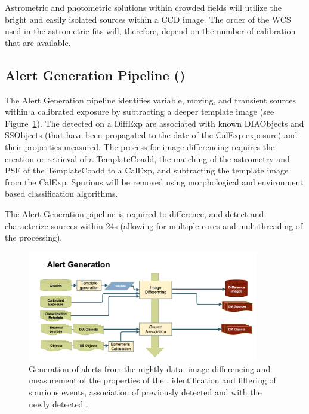 Astrometric and photometric solutions  within crowded fields will utilize the bright and easily isolated sources within a CCD image. The order of the WCS used in the astrometric fits will, therefore, depend on the number of calibration \Sources that are available.

\subsection{Alert Generation Pipeline (\wbsDiffim)}
\label{sec:apAlertGeneration}

The Alert Generation pipeline identifies variable, moving, and transient sources within a calibrated exposure by subtracting a deeper template image (see Figure~\ref{fig:apAlertgen}). The \DIASources detected on a DiffExp are associated with known DIAObjects and SSObjects (that have been propagated to the date of the CalExp exposure) and their properties measured. The process for image differencing requires the creation or retrieval of a TemplateCoadd, the matching of the  astrometry and PSF of the TemplateCoadd to a CalExp, and subtracting the template image from the CalExp. Spurious \DIASources will be removed using morphological and environment based classification algorithms. 

The Alert Generation pipeline is required to difference, and detect and characterize \DIASource sources within 24s (allowing for multiple cores and multithreading of the processing). 


\begin{figure}[th]
\begin{center}
\includegraphics[width=0.9\textwidth]{figures/Alert_Generation.png}
\caption{\label{fig:apAlertgen} Generation of alerts from the nightly data: image differencing and measurement of the properties of the \DIASources, identification and filtering of spurious events, association of previously detected \DIAObjects and \SSObjects with the newly detected \DIASources. }
\end{center}
\end{figure} 
